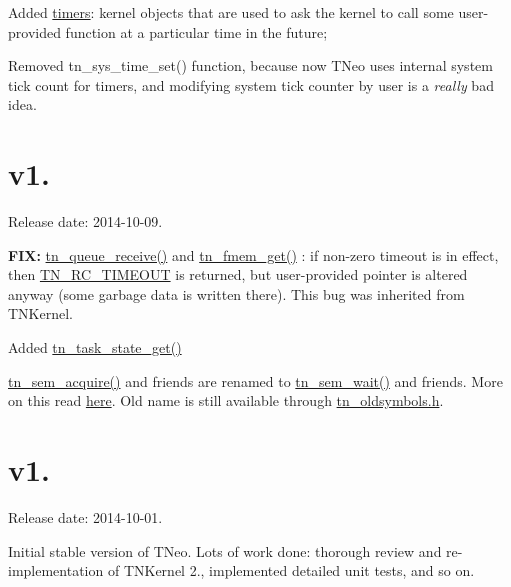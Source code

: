 \begin{DoxyItemize}
\item Added \hyperlink{tn__timer_8h}{timers}\+: kernel objects that are used to ask the kernel to call some user-\/provided function at a particular time in the future;
\item Removed {\ttfamily tn\+\_\+sys\+\_\+time\+\_\+set()} function, because now T\+Neo uses internal system tick count for timers, and modifying system tick counter by user is a {\itshape really} bad idea.
\end{DoxyItemize}\hypertarget{changelog_changelog_v1_01}{}\section{v1.}\label{changelog_changelog_v1_01}
Release date\+: 2014-\/10-\/09.


\begin{DoxyItemize}
\item {\bfseries F\+I\+X\+:} {\ttfamily \hyperlink{tn__dqueue_8h_ab47ed49af7dffc5a71eaabd25422d0e4}{tn\+\_\+queue\+\_\+receive()}} and {\ttfamily \hyperlink{tn__fmem_8h_a2ecd094041dbd0e92d61b852b7952444}{tn\+\_\+fmem\+\_\+get()}} \+: if non-\/zero {\ttfamily timeout} is in effect, then {\ttfamily \hyperlink{tn__common_8h_aa43bd3da1ad4c1e61224b5f23b369876a5b4d73fde6b5d1c9579c02e6aafce1fb}{T\+N\+\_\+\+R\+C\+\_\+\+T\+I\+M\+E\+O\+U\+T}} is returned, but user-\/provided pointer is altered anyway (some garbage data is written there). This bug was inherited from T\+N\+Kernel.
\item Added {\ttfamily \hyperlink{tn__tasks_8h_a18408d825c0dab03511f3aaeeb3ffbb3}{tn\+\_\+task\+\_\+state\+\_\+get()}}
\item {\ttfamily \hyperlink{tn__oldsymbols_8h_abdc5c428590ff525cdb566da613015ce}{tn\+\_\+sem\+\_\+acquire()}} and friends are renamed to {\ttfamily \hyperlink{tn__sem_8h_acfed2a27719c87638d2eb6edfdeea150}{tn\+\_\+sem\+\_\+wait()}} and friends. More on this read \hyperlink{tnkernel_diff_tnkernel_diff_api_rename_sem}{here}. Old name is still available through {\ttfamily \hyperlink{tn__oldsymbols_8h}{tn\+\_\+oldsymbols.\+h}}.
\end{DoxyItemize}\hypertarget{changelog_changelog_v1_0}{}\section{v1.}\label{changelog_changelog_v1_0}
Release date\+: 2014-\/10-\/01.


\begin{DoxyItemize}
\item Initial stable version of T\+Neo. Lots of work done\+: thorough review and re-\/implementation of T\+N\+Kernel 2., implemented detailed unit tests, and so on. 
\end{DoxyItemize}